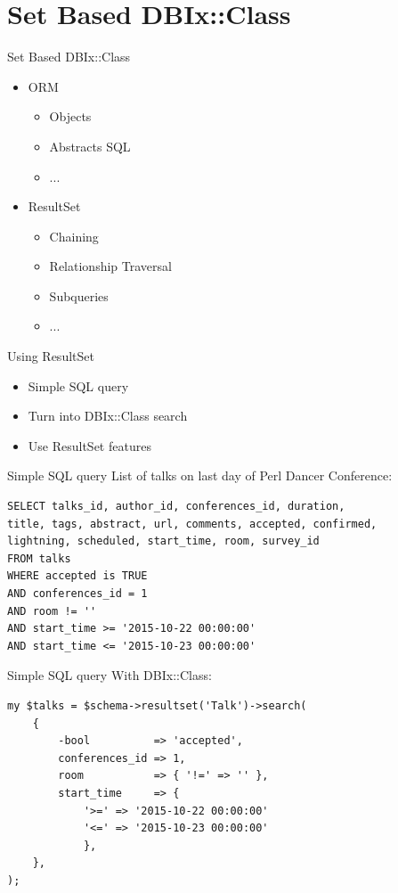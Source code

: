 \section{Set Based DBIx::Class}


\begin{frame}{Set Based DBIx::Class}
\begin{itemize}
\item ORM
\begin{itemize}
\item Objects
\item Abstracts SQL
\item ...
\end{itemize}
\item ResultSet
\begin{itemize}
\item Chaining
\item Relationship Traversal
\item Subqueries
\item ...
\end{itemize}
\end{itemize}
\end{frame}

\begin{frame}{Using ResultSet}
\begin{itemize}
\item Simple SQL query
\item Turn into DBIx::Class search
\item Use ResultSet features
\end{itemize}
\end{frame}

\begin{frame}[fragile]{Simple SQL query}
List of talks on last day of Perl Dancer Conference:
\begin{lstlisting}
SELECT talks_id, author_id, conferences_id, duration,
title, tags, abstract, url, comments, accepted, confirmed, 
lightning, scheduled, start_time, room, survey_id 
FROM talks 
WHERE accepted is TRUE 
AND conferences_id = 1 
AND room != '' 
AND start_time >= '2015-10-22 00:00:00'
AND start_time <= '2015-10-23 00:00:00'
\end{lstlisting}
\end{frame}

\begin{frame}[fragile]{Simple SQL query}
With DBIx::Class:
\begin{lstlisting}
my $talks = $schema->resultset('Talk')->search(
    {
        -bool          => 'accepted',
        conferences_id => 1,
        room           => { '!=' => '' },
        start_time     => {
            '>=' => '2015-10-22 00:00:00'
            '<=' => '2015-10-23 00:00:00'
            },
    },
);
\end{lstlisting}
\end{frame}

